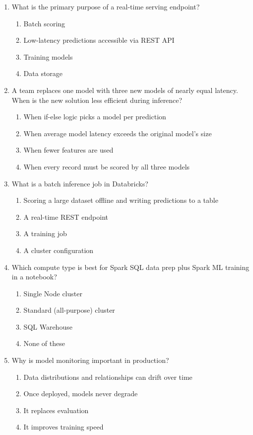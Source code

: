 \documentclass[11pt]{article}
\begin{document}
\begin{enumerate}[leftmargin=*, label=\textbf{Q\arabic*.}, start=89]
		\item What is the primary purpose of a real-time serving endpoint?
		\begin{enumerate}[label=(\alph*)]
			\item Batch scoring
			\item Low-latency predictions accessible via REST API
			\item Training models
			\item Data storage
		\end{enumerate}
		
		\item A team replaces one model with three new models of nearly equal latency. When is the new solution less efficient during inference?
		\begin{enumerate}[label=(\alph*)]
			\item When if-else logic picks a model per prediction
			\item When average model latency exceeds the original model's size
			\item When fewer features are used
			\item When every record must be scored by all three models
		\end{enumerate}
		
		\item What is a batch inference job in Databricks?
		\begin{enumerate}[label=(\alph*)]
			\item Scoring a large dataset offline and writing predictions to a table
			\item A real-time REST endpoint
			\item A training job
			\item A cluster configuration
		\end{enumerate}
		
		\item Which compute type is best for Spark SQL data prep plus Spark ML training in a notebook?
		\begin{enumerate}[label=(\alph*)]
			\item Single Node cluster
			\item Standard (all-purpose) cluster
			\item SQL Warehouse
			\item None of these
		\end{enumerate}
		
		\item Why is model monitoring important in production?
		\begin{enumerate}[label=(\alph*)]
			\item Data distributions and relationships can drift over time
			\item Once deployed, models never degrade
			\item It replaces evaluation
			\item It improves training speed
		\end{enumerate}
		

\end{enumerate}
\end{document}
